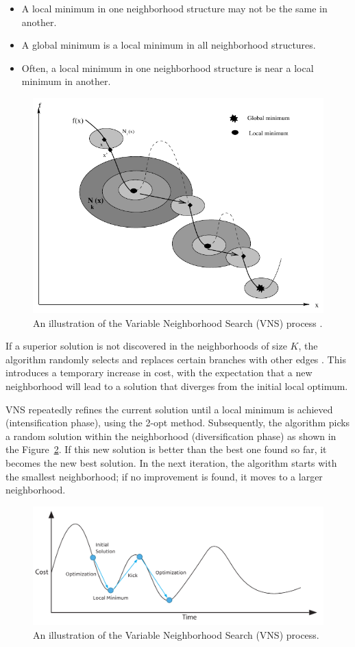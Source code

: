 \begin{itemize}
    \item A local minimum in one neighborhood structure may not be the same in another.
    \item A global minimum is a local minimum in all neighborhood structures.
    \item Often, a local minimum in one neighborhood structure is near a local minimum in another.
\end{itemize}

\begin{figure}[H]
    \centering
    \includegraphics[width=0.65\linewidth]{Immagini/vns.pdf}
    \caption{An illustration of the Variable Neighborhood Search (VNS) process \cite{Hansenvns}.}
    \label{fig:vns}
\end{figure}

If a superior solution is not discovered in the neighborhoods of size \( K \), the algorithm randomly selects and replaces certain branches with other edges \cite{Hansen2019}. This introduces a temporary increase in cost, with the expectation that a new neighborhood will lead to a solution that diverges from the initial local optimum.

VNS repeatedly refines the current solution until a local minimum is achieved (intensification phase), using the 2-opt method. Subsequently, the algorithm picks a random solution within the neighborhood (diversification phase) as shown in the Figure~\ref{fig:vns_kick}. If this new solution is better than the best one found so far, it becomes the new best solution. In the next iteration, the algorithm starts with the smallest neighborhood; if no improvement is found, it moves to a larger neighborhood.

\begin{figure}[H]
    \centering
    \includegraphics[width=0.85\linewidth]{Immagini/vns-kick.pdf}
    \caption{An illustration of the Variable Neighborhood Search (VNS) process.}
    \label{fig:vns_kick}
\end{figure}

